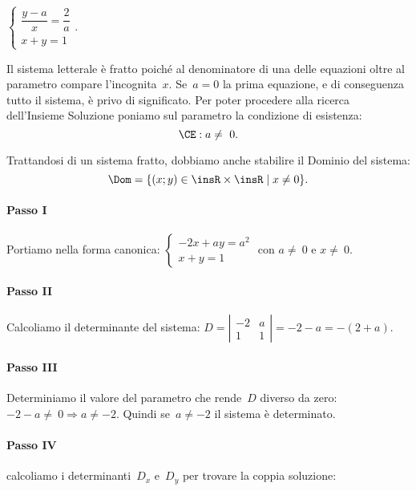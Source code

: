 \begin{exrig}
 \vspace{1.10ex}
 \begin{esempio}
$\left\{\begin{array}{l}\dfrac{y-a}{x}=\dfrac{2}{a}\\{x+y=1}\end{array}\right..$

Il sistema letterale è fratto poiché al denominatore di una delle equazioni oltre al parametro
compare l'incognita~$x$. Se~$a=0$ la prima equazione, e di conseguenza tutto il sistema, è
privo di significato. Per poter procedere alla ricerca
dell'Insieme Soluzione poniamo sul
parametro la condizione di esistenza:
\begin{equation}
\label{eq:23.1}
\CE: a\neq~0.
\end{equation}

Trattandosi di un sistema fratto, dobbiamo anche stabilire il Dominio del sistema:
\begin{equation}
 \label{eq:23.2}
\Dom=\{(x;y)\in \insR\times \insR\mid x\neq 0\}.
 \end{equation}

\paragraph{Passo I} Portiamo nella forma canonica:
$\left\{\begin{array}{l}-2x+ay=a^{2}\\x+y=1\end{array}\right.\text{ con }a\neq~0\text{ e }x\neq~0$.
\paragraph{Passo II} Calcoliamo il determinante del sistema:
$D=\left|\begin{array}{cc}{-2}&{a}\\{1}&{1}\end{array}\right|=-2-a=-(2+a)$.

\paragraph{Passo III} Determiniamo il valore del parametro che
rende~$D$ diverso da zero:~$-2-a\neq~0\Rightarrow a\neq -2$.
Quindi se~$a\neq -2$ il sistema è determinato.

\paragraph{Passo IV} calcoliamo i determinanti~$D_{x}$
e~$D_{y}$ per trovare la coppia soluzione:


\end{esempio}
\end{exrig}
